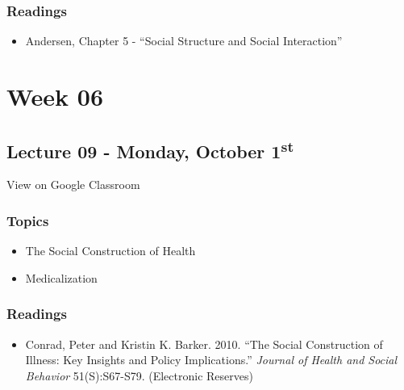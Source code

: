 \documentclass[]{book}
\providecommand{\tightlist}{%
  \setlength{\itemsep}{0pt}\setlength{\parskip}{0pt}}
\theoremstyle{definition}
\theoremstyle{definition}
\theoremstyle{definition}
\theoremstyle{remark}
\begin{document}
\hypertarget{readings-8}{%
\subsubsection*{Readings}\label{readings-8}}

\begin{itemize}
\tightlist
\item
  Andersen, Chapter 5 - ``Social Structure and Social Interaction''
\end{itemize}

\hypertarget{week-06}{%
\section*{Week 06}\label{week-06}}

\hypertarget{lecture-09---monday-october-1st}{%
\subsection*{\texorpdfstring{Lecture 09 - Monday, October
1\textsuperscript{st}}{Lecture 09 - Monday, October 1st}}\label{lecture-09---monday-october-1st}}

View on Google Classroom

\hypertarget{topics-10}{%
\subsubsection*{Topics}\label{topics-10}}

\begin{itemize}
\tightlist
\item
  The Social Construction of Health
\item
  Medicalization
\end{itemize}

\hypertarget{readings-9}{%
\subsubsection*{Readings}\label{readings-9}}

\begin{itemize}
\tightlist
\item
  Conrad, Peter and Kristin K. Barker. 2010. ``The Social Construction
  of Illness: Key Insights and Policy Implications.'' \emph{Journal of
  Health and Social Behavior} 51(S):S67-S79. (Electronic Reserves)
\end{itemize}
\end{document}
